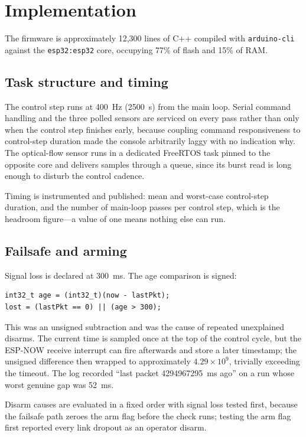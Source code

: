 \documentclass[conference]{IEEEtran}
\begin{document}
\section{Implementation}
\label{sec:impl}

The firmware is approximately 12{,}300 lines of C++ compiled with
\texttt{arduino-cli} against the \texttt{esp32:esp32} core, occupying 77\% of
flash and 15\% of RAM.

\subsection{Task structure and timing}

The control step runs at 400~Hz (2500~\textmu s) from the main loop. Serial
command handling and the three polled sensors are serviced on every pass
rather than only when the control step finishes early, because coupling
command responsiveness to control-step duration made the console arbitrarily
laggy with no indication why. The optical-flow sensor runs in a dedicated
FreeRTOS task pinned to the opposite core and delivers samples through a
queue, since its burst read is long enough to disturb the control cadence.

Timing is instrumented and published: mean and worst-case control-step
duration, and the number of main-loop passes per control step, which is the
headroom figure---a value of one means nothing else can run.

\subsection{Failsafe and arming}

Signal loss is declared at 300~ms. The age comparison is signed:
{\footnotesize
\begin{verbatim}
int32_t age = (int32_t)(now - lastPkt);
lost = (lastPkt == 0) || (age > 300);
\end{verbatim}
}
This was an unsigned subtraction and was the cause of repeated unexplained
disarms. The current time is sampled once at the top of the control cycle,
but the ESP-NOW receive interrupt can fire afterwards and store a later
timestamp; the unsigned difference then wrapped to approximately
$4.29\times10^{9}$, trivially exceeding the timeout. The log recorded ``last
packet 4294967295~ms ago'' on a run whose worst genuine gap was 52~ms.

Disarm causes are evaluated in a fixed order with signal loss tested first,
because the failsafe path zeroes the arm flag before the check runs; testing
the arm flag first reported every link dropout as an operator disarm.
\end{document}
